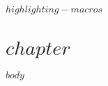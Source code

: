 $highlighting-macros$
\chapter{$chapter$} %
\graphicspath{{$graphicspath$}}
\linespread{1.3}
$body$

\clearpage %
